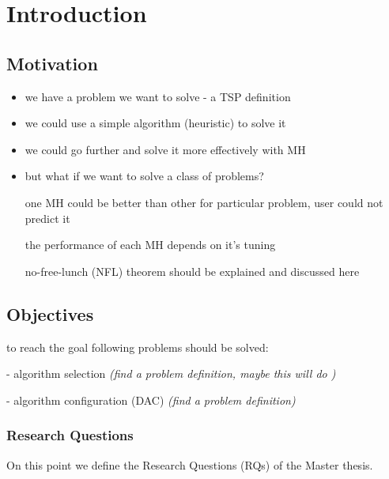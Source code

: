 \chapter{Introduction}\label{intro}


\section{Motivation}
\begin{itemize}
	\item we have a problem we want to solve - a TSP definition
	
	\item we could use a simple algorithm (heuristic) to solve it
	
	\item we could go further and solve it more effectively with MH
	
	\item but what if we want to solve a class of problems? 

	\subitem one MH could be better than other for particular problem, user could not predict it \cite{surv:kerschke2019automated}
	
	\subitem the performance of each MH depends on it's tuning
	
	\subitem no-free-lunch (NFL) theorem should be explained and discussed here
\end{itemize}


\section{Objectives}

to reach the goal following problems should be solved:

- algorithm selection \textit{(find a problem definition, maybe this will do \cite{surv:kerschke2019automated})}

- algorithm configuration (DAC) \textit{(find a problem definition)}


\subsection{Research Questions}
On this point we define the Research Questions (RQs) of the Master thesis.

